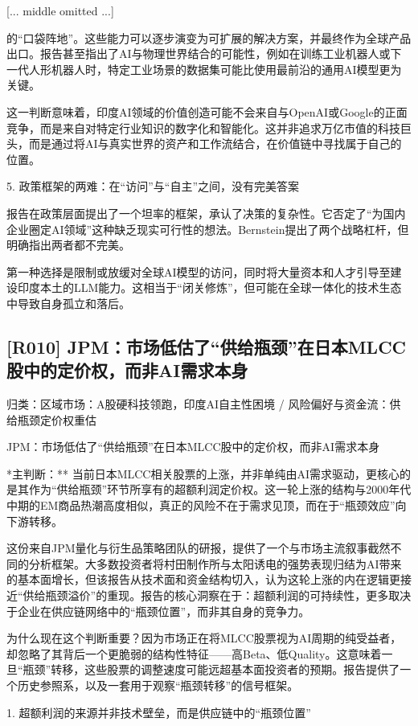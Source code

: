 \documentclass[11pt]{ctexart}
\begin{document}
[... middle omitted ...]

的“口袋阵地”。这些能力可以逐步演变为可扩展的解决方案，并最终作为全球产品出口。报告甚至指出了AI与物理世界结合的可能性，例如在训练工业机器人或下一代人形机器人时，特定工业场景的数据集可能比使用最前沿的通用AI模型更为关键。

这一判断意味着，印度AI领域的价值创造可能不会来自与OpenAI或Google的正面竞争，而是来自对特定行业知识的数字化和智能化。这并非追求万亿市值的科技巨头，而是通过将AI与真实世界的资产和工作流结合，在价值链中寻找属于自己的位置。

5. 政策框架的两难：在“访问”与“自主”之间，没有完美答案

报告在政策层面提出了一个坦率的框架，承认了决策的复杂性。它否定了“为国内企业圈定AI领域”这种缺乏现实可行性的想法。Bernstein提出了两个战略杠杆，但明确指出两者都不完美。

第一种选择是限制或放缓对全球AI模型的访问，同时将大量资本和人才引导至建设印度本土的LLM能力。这相当于“闭关修炼”，但可能在全球一体化的技术生态中导致自身孤立和落后。

\subsection{[R010] JPM：市场低估了“供给瓶颈”在日本MLCC股中的定价权，而非AI需求本身}
{\small\color{refgray}归类：区域市场：A股硬科技领跑，印度AI自主性困境 / 风险偏好与资金流：供给瓶颈定价权重估}

JPM：市场低估了“供给瓶颈”在日本MLCC股中的定价权，而非AI需求本身

*主判断：** 当前日本MLCC相关股票的上涨，并非单纯由AI需求驱动，更核心的是其作为“供给瓶颈”环节所享有的超额利润定价权。这一轮上涨的结构与2000年代中期的EM商品热潮高度相似，真正的风险不在于需求见顶，而在于“瓶颈效应”向下游转移。

这份来自JPM量化与衍生品策略团队的研报，提供了一个与市场主流叙事截然不同的分析框架。大多数投资者将村田制作所与太阳诱电的强势表现归结为AI带来的基本面增长，但该报告从技术面和资金结构切入，认为这轮上涨的内在逻辑更接近“供给瓶颈溢价”的重现。报告的核心洞察在于：超额利润的可持续性，更多取决于企业在供应链网络中的“瓶颈位置”，而非其自身的竞争力。

为什么现在这个判断重要？因为市场正在将MLCC股票视为AI周期的纯受益者，却忽略了其背后一个更脆弱的结构性特征——高Beta、低Quality。这意味着一旦“瓶颈”转移，这些股票的调整速度可能远超基本面投资者的预期。报告提供了一个历史参照系，以及一套用于观察“瓶颈转移”的信号框架。

1. 超额利润的来源并非技术壁垒，而是供应链中的“瓶颈位置”
\end{document}
